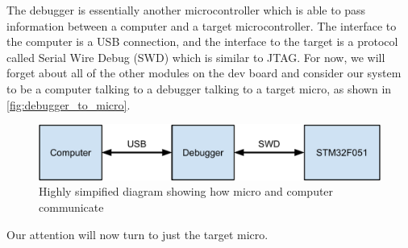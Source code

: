 The debugger is essentially another microcontroller which is able to pass information between a computer and a target microcontroller. 
The interface to the computer is a USB connection, and the interface to the target is a protocol called Serial Wire Debug (SWD) which is similar to JTAG. For now, we will forget about all of the other modules on the dev board and consider our system to be a computer talking to a debugger talking to a target micro, as shown in \autoref{fig:debugger_to_micro}. 

\begin{figure}[t]
  \includegraphics[width=\textwidth]{./week1/debugger_to_micro.pdf}
  \caption{Highly simpified diagram showing how micro and computer communicate}
  \label{fig:debugger_to_micro}
\end{figure}

Our attention will now turn to just the target micro.

